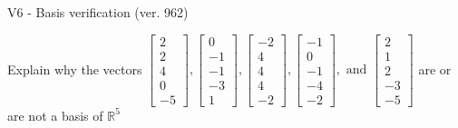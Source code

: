 \begin{exercise}
  \begin{exerciseTitle}V6 - Basis verification (ver. 962)\end{exerciseTitle}
  \begin{exerciseStatement}
    Explain why the vectors \(\left[\begin{array}{r}
2 \\
2 \\
4 \\
0 \\
-5
\end{array}\right] , \left[\begin{array}{r}
0 \\
-1 \\
-1 \\
-3 \\
1
\end{array}\right] , \left[\begin{array}{r}
-2 \\
4 \\
4 \\
4 \\
-2
\end{array}\right] , \left[\begin{array}{r}
-1 \\
0 \\
-1 \\
-4 \\
-2
\end{array}\right] , \text{ and } \left[\begin{array}{r}
2 \\
1 \\
2 \\
-3 \\
-5
\end{array}\right]\) are or are not a basis of \(\mathbb{R}^5\)	



\end{exerciseStatement}
\end{exercise}

